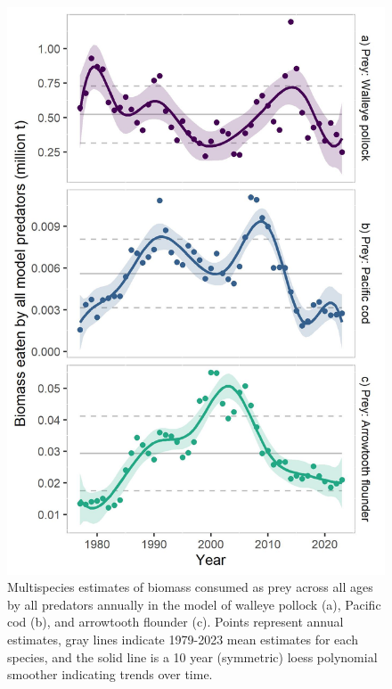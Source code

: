 \documentclass[
]{article}
\begin{document}
\begin{figure}
\centering
\includegraphics{Results/ESR_Fig2.jpg}
\caption{Multispecies estimates of biomass consumed as prey across all
ages by all predators annually in the model of walleye pollock (a),
Pacific cod (b), and arrowtooth flounder (c). Points represent annual
estimates, gray lines indicate 1979-2023 mean estimates for each
species, and the solid line is a 10 year (symmetric) loess polynomial
smoother indicating trends over time.}
\end{figure}
\end{document}
